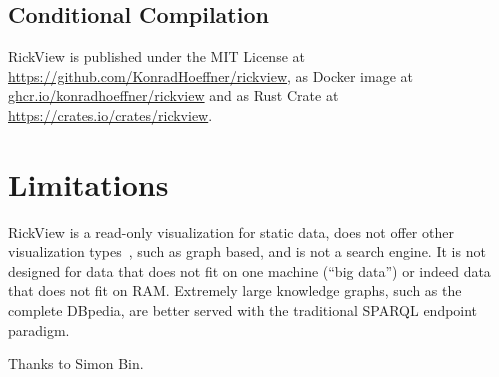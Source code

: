 \documentclass{ceurart}
\begin{document}
\subsection{Conditional Compilation}


RickView is published under the MIT License at \url{https://github.com/KonradHoeffner/rickview}, as Docker image at \url{ghcr.io/konradhoeffner/rickview} and as Rust Crate at \url{https://crates.io/crates/rickview}.

\section{Limitations}
RickView is a read-only visualization for static data, does not offer other visualization types~\citep{linkeddatavisualization}, such as graph based, and is not a search engine.
It is not designed for data that does not fit on one machine (\enquote{big data}) or indeed data that does not fit on RAM.
Extremely large knowledge graphs, such as the complete DBpedia, are better served with the traditional SPARQL endpoint paradigm.


\begin{acknowledgments}
Thanks to Simon Bin.
\end{acknowledgments}
%
%

\end{document}
